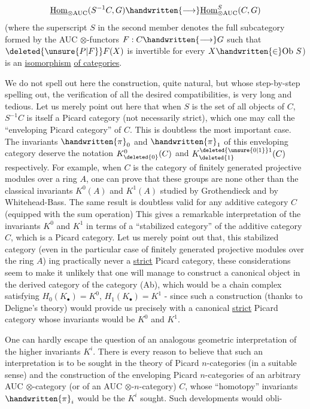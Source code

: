 \[
\underline{\mathrm{Hom}}_{\otimes\mathrm{AUC}}(S^{-1}C,G)\handwritten{\longrightarrow}\underline{\mathrm{Hom}}_{\otimes\mathrm{AUC}}^{S}(C,G)
\]
(where the superscript $S$ in the second member denotes the full subcategory formed by the AUC $\otimes$-functors $F:C\handwritten{\longrightarrow}G$ such that $\deleted{\unsure{P|F}}F(X)$ is invertible for every $X\handwritten{\in}\mathrm{Ob}\ S$) is an \uline{isomorphism} \uline{of categories}.

We do not spell out here the construction, quite natural, but whose step-by-step spelling out,  the verification of all the desired compatibilities, is very long and tedious. Let us merely point out here that when $S$ is the set of all objects of $C$, $S^{-1}C$ is itself a Picard category (not necessarily strict), which one may call the ``enveloping Picard category'' of $C$. This is doubtless the most important case. The invariants $\handwritten{\pi}_{0}$ and $\handwritten{\pi}_{1}$ of this enveloping category deserve the notation $K^{0}_{\deleted{0}}(C)$ and $K^{\deleted{\unsure{0|1}}1}_{\deleted{1}}(C)$ respectively. For example, when $C$ is the category of finitely generated projective modules over a ring $A$,  one can prove that these groups are none other than the classical invariants $K^{0}(A)$ and $K^{1}(A)$ studied by Grothendieck and by Whitehead-Bass. The same result is doubtless valid for any additive category $C$ (equipped with  the sum operation) This gives a remarkable interpretation of the invariants $K^{0}$ and $K^{1}$ in terms of a ``stabilized category'' \handwritten{(}of the additive category $C$\handwritten{)}, which is a Picard category. Let us merely point out that, this stabilized category (even in the particular case of finitely generated projective modules over the ring $A$) ing practically never a \uline{strict} Picard category, these considerations seem to make it unlikely that one will manage to construct a canonical object in the derived category of the category (Ab), which would be a chain complex satisfying $H_{0}(K_{\bullet})=K^{0}$, $H_{1}(K_{\bullet})=K^{1}$ - since such a construction (thanks to Deligne's theory) would provide us precisely with a canonical \uline{strict} Picard category whose invariants would be $K^{0}$ and $K^{1}$.

One can hardly escape the question of an analogous geometric interpretation of the higher invariants $K^{i}$. There is every reason to believe that such an interpretation is to be sought in the theory of Picard $n$-categories (in a suitable sense) and the construction of the enveloping Picard $n$-categories of an arbitrary AUC $\otimes$-category (or of an AUC $\otimes$-$n$-category) $C$, whose ``homotopy'' invariants $\handwritten{\pi}_{i}$ would be the $K^{i}$ sought. Such developments would obli-

